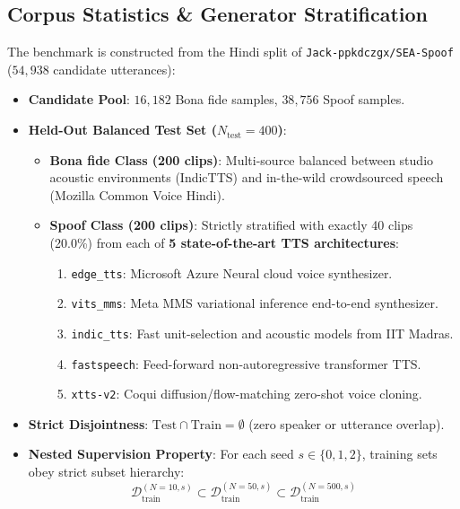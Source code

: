 \documentclass[11pt,a4paper]{article}
\begin{document}
\subsection{Corpus Statistics \& Generator Stratification}
The benchmark is constructed from the Hindi split of \texttt{Jack-ppkdczgx/SEA-Spoof} ($54,938$ candidate utterances):
\begin{itemize}
    \item \textbf{Candidate Pool}: $16,182$ Bona fide samples, $38,756$ Spoof samples.
    \item \textbf{Held-Out Balanced Test Set ($N_{\text{test}} = 400$)}:
    \begin{itemize}
        \item \textbf{Bona fide Class (200 clips)}: Multi-source balanced between studio acoustic environments (IndicTTS) and in-the-wild crowdsourced speech (Mozilla Common Voice Hindi).
        \item \textbf{Spoof Class (200 clips)}: Strictly stratified with exactly 40 clips (20.0\%) from each of \textbf{5 state-of-the-art TTS architectures}:
        \begin{enumerate}
            \item \texttt{edge\_tts}: Microsoft Azure Neural cloud voice synthesizer.
            \item \texttt{vits\_mms}: Meta MMS variational inference end-to-end synthesizer.
            \item \texttt{indic\_tts}: Fast unit-selection and acoustic models from IIT Madras.
            \item \texttt{fastspeech}: Feed-forward non-autoregressive transformer TTS.
            \item \texttt{xtts-v2}: Coqui diffusion/flow-matching zero-shot voice cloning.
        \end{enumerate}
    \end{itemize}
    \item \textbf{Strict Disjointness}: $\text{Test} \cap \text{Train} = \emptyset$ (zero speaker or utterance overlap).
    \item \textbf{Nested Supervision Property}: For each seed $s \in \{0, 1, 2\}$, training sets obey strict subset hierarchy:
    \begin{equation}
    \mathcal{D}_{\text{train}}^{(N=10, s)} \subset \mathcal{D}_{\text{train}}^{(N=50, s)} \subset \mathcal{D}_{\text{train}}^{(N=500, s)}
    \end{equation}
\end{itemize}
\end{document}
